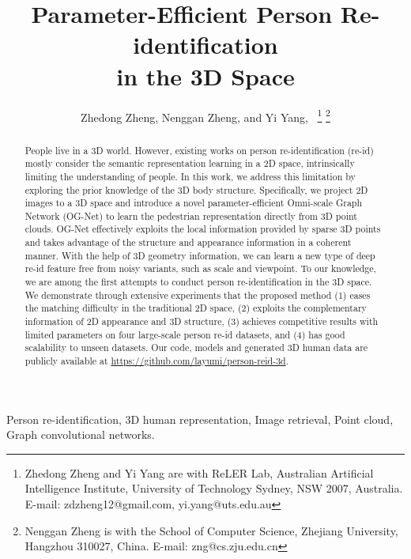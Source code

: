 \documentclass[journal]{IEEEtran}
\begin{document}
\title{Parameter-Efficient Person Re-identification \\ in the 3D Space}
\author{Zhedong Zheng, Nenggan Zheng, and Yi Yang,~ \thanks{Zhedong Zheng and Yi Yang are with ReLER Lab, Australian Artificial Intelligence Institute, University of Technology Sydney, NSW 2007, Australia. E-mail: zdzheng12@gmail.com, yi.yang@uts.edu.au }
\thanks{
Nenggan Zheng is with the School of Computer Science, Zhejiang University, Hangzhou 310027, China. E-mail: zng@cs.zju.edu.cn }
}



\maketitle

\begin{abstract}
 People live in a 3D world. However, existing works on person re-identification (re-id) mostly consider the semantic representation learning in a 2D space, intrinsically limiting the understanding of people. 
 In this work, we address this limitation by exploring the prior knowledge of the 3D body structure. 
 Specifically, we project 2D images to a 3D space and introduce a novel parameter-efficient Omni-scale Graph Network (OG-Net) to learn the pedestrian representation directly from 3D point clouds.
 OG-Net effectively exploits the local information provided by sparse 3D points and takes advantage of the structure and appearance information in a coherent manner.  With the help of 3D geometry information, we can learn a new type of deep re-id feature free from noisy variants, such as scale and viewpoint. To our knowledge, we are among the first attempts to conduct person re-identification in the 3D space.  
 We demonstrate through extensive experiments that the proposed method (1) eases the matching difficulty in the traditional 2D space, (2) exploits the complementary information of 2D appearance and 3D structure,  (3) achieves competitive results with limited parameters on four large-scale person re-id datasets, 
 and (4) has good scalability to unseen datasets. 
 Our code, models and generated 3D human data are publicly available at \url{https://github.com/layumi/person-reid-3d}.

\end{abstract}

\begin{IEEEkeywords}
Person re-identification, 3D human representation, Image retrieval, Point cloud,  Graph convolutional networks.
\end{IEEEkeywords}
\end{document}
